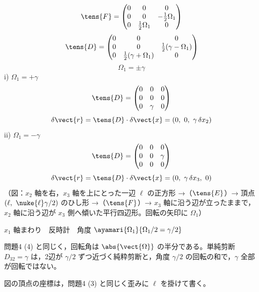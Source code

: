 \[ \tens{F}=\begin{pmatrix}0&0&0\\0&0&-\frac{1}{2}\Omega_{1}\\0&\frac{1}{2}\Omega_{1}&0\end{pmatrix} \]
\[ \tens{D}=\begin{pmatrix}0&0&0\\0&0&\frac{1}{2}(\gamma-\Omega_{1})\\0&\frac{1}{2}(\gamma+\Omega_{1})&0\end{pmatrix} \]
\[ \Omega_{1}=\pm\gamma \]
i) $\Omega_{1}=+\gamma$
\[ \tens{D}=\begin{pmatrix}0&0&0\\0&0&0\\0&\gamma&0\end{pmatrix} \]
\[ \delta\vect{r}=\tens{D}\cdot\delta\vect{x}=(0,\ 0,\ \gamma\,\delta x_{2}) \]
ii) $\Omega_{1}=-\gamma$
\[ \tens{D}=\begin{pmatrix}0&0&0\\0&0&\gamma\\0&0&0\end{pmatrix} \]
\[ \delta\vect{r}=\tens{D}\cdot\delta\vect{x}=(0,\ \gamma\,\delta x_{3},\ 0) \]
（図：$x_{2}$ 軸を右，$x_{3}$ 軸を上にとった一辺 $\ell$ の正方形 →（$\tens{E}$）→ 頂点 $(\ell,\ \nuke{\ell}\gamma/2)$ のひし形 →（$\tens{F}$）→ $x_{3}$ 軸に沿う辺が立ったままで，$x_{2}$ 軸に沿う辺が $x_{3}$ 側へ傾いた平行四辺形。回転の矢印に $\Omega_{1}$）

$x_{1}$ 軸まわり　反時計　角度 $\ayamari{\Omega_{1}}{\Omega_{1}/2=\gamma/2}$
\item 問題4 (4) と同じく，回転角は $\abs{\vect{\Omega}}$ の半分である。単純剪断 $D_{32}=\gamma$ は，2辺が $\gamma/2$ ずつ近づく純粋剪断と，角度 $\gamma/2$ の回転の和で，$\gamma$ 全部が回転ではない。
\item 図の頂点の座標は，問題4 (3) と同じく歪みに $\ell$ を掛けて書く。
